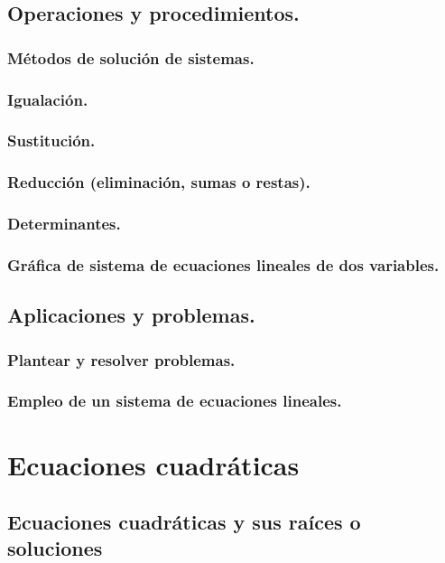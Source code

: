 \subsection{Operaciones y procedimientos.}
\subsubsection{Métodos de solución de sistemas.}
\subsubsection{Igualación.}
\subsubsection{Sustitución.}
\subsubsection{Reducción (eliminación, sumas o restas).}
\subsubsection{Determinantes.}
\subsubsection{Gráfica de sistema de ecuaciones lineales de dos variables.}
\subsection{Aplicaciones y problemas.}
\subsubsection{Plantear y resolver problemas.}
\subsubsection{Empleo de un sistema de ecuaciones lineales.}







\section{Ecuaciones cuadráticas} %
\subsection{Ecuaciones cuadráticas y sus raíces o soluciones}
